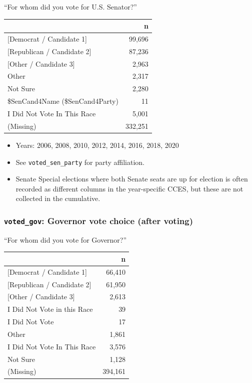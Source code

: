 \documentclass[10pt,article,oneside]{memoir}
\theoremstyle{definition}
\begin{document}
``For whom did you vote for U.S. Senator?''

\begin{table}[H]
\centering
\begin{tabular}{lr}
\toprule
 & n\\
\midrule
{[Democrat / Candidate 1]} & 99,696\\
{[Republican / Candidate 2]} & 87,236\\
{[Other / Candidate 3]} & 2,963\\
Other & 2,317\\
Not Sure & 2,280\\
\$SenCand4Name (\$SenCand4Party) & 11\\
I Did Not Vote In This Race & 5,001\\
(Missing) & 332,251\\
\bottomrule
\end{tabular}
\end{table}

\begin{itemize}
\tightlist
\item
  Years: 2006, 2008, 2010, 2012, 2014, 2016, 2018, 2020
\item
  See \texttt{voted\_sen\_party} for party affiliation.
\item
  Senate Special elections where both Senate seats are up for election
  is often recorded as different columns in the year-specific CCES, but
  these are not collected in the cumulative.
\end{itemize}

\hypertarget{voted_gov-governor-vote-choice-after-voting}{%
\subsubsection{\texorpdfstring{\texttt{voted\_gov}: Governor vote choice
(after
voting)}{voted\_gov: Governor vote choice (after voting)}}\label{voted_gov-governor-vote-choice-after-voting}}

``For whom did you vote for Governor?''

\begin{table}[H]
\centering
\begin{tabular}{lr}
\toprule
 & n\\
\midrule
{[Democrat / Candidate 1]} & 66,410\\
{[Republican / Candidate 2]} & 61,950\\
{[Other / Candidate 3]} & 2,613\\
I Did Not Vote in this Race & 39\\
I Did Not Vote & 17\\
Other & 1,861\\
I Did Not Vote In This Race & 3,576\\
Not Sure & 1,128\\
(Missing) & 394,161\\
\bottomrule
\end{tabular}
\end{table}
\end{document}
